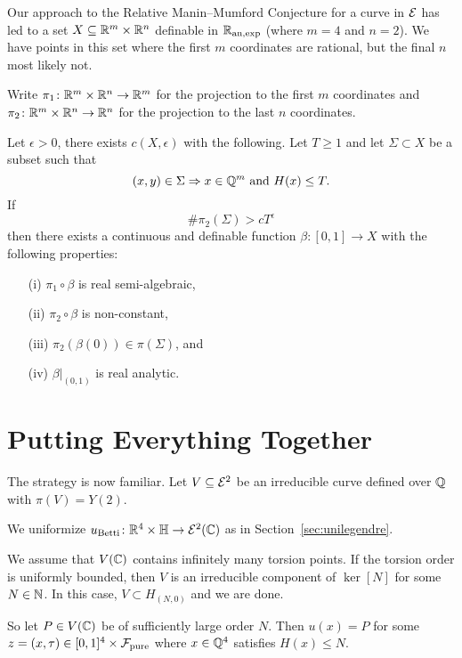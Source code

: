 Our approach to the Relative Manin--Mumford Conjecture for a curve in
${\mathcal E}$ has led to a set $X\subseteq {\mathbb{R}}^m\times{\mathbb{R}}^n$
definable in ${{\mathbb{R}}_{\mathrm{an,exp}}}$
(where $m=4$ and $n=2$). We have points in this set where the
first $m$ coordinates are rational, but the final $n$ most likely not.

Write $\pi_1\colon{\mathbb{R}}^m\times{\mathbb{R}}^n\rightarrow{\mathbb{R}}^m$ for the projection
to the first $m$ coordinates and
$\pi_2\colon{\mathbb{R}}^m\times{\mathbb{R}}^n\rightarrow{\mathbb{R}}^n$ for the projection to
the last $n$ coordinates. 

\begin{theorem}
  \label{thm:semirationalpw}
  Let $\epsilon>0$, there exists $c(X,\epsilon)$ with the following.
  Let $T\ge 1$ and let $\Sigma\subset X$ be a subset such that
  $$(x,y)\in
  \Sigma\Rightarrow x\in {\mathbb{Q}}^m \text{ and }H(x)\le T.$$
  If
  $$\#\pi_2(\Sigma)>cT^\epsilon$$
  then there exists a continuous and definable function $\beta\colon
  [0,1]\rightarrow X$ with the following properties:
  \begin{enumerate}
  \item [(i)] $\pi_1\circ\beta$ is real semi-algebraic,
  \item[(ii)] $\pi_2\circ\beta$ is non-constant,
  \item[(iii)] $\pi_2(\beta(0))\in \pi(\Sigma)$, and
  \item[(iv)] $\beta|_{(0,1)}$ is real analytic. 
  \end{enumerate}
\end{theorem}

\section{Putting Everything Together}

The strategy is now familiar.
Let $V\subseteq{\mathcal E}^2$ be an irreducible curve defined over ${\mathbb{Q}}$ with
$\pi(V)=Y(2)$.

We uniformize $u_{\mathrm{Betti}}\colon {\mathbb{R}}^4\times{\mathbb{H}} \rightarrow
{\mathcal E}^{2}({\mathbb{C}})$ as in Section~\ref{sec:unilegendre}.


We assume that $V({\mathbb{C}})$ contains infinitely many torsion points.
If the torsion order is uniformly bounded, then $V$ is an irreducible
component of $\ker[N]$ for some $N\in{\mathbb{N}}$.
In this case, $V\subset H_{(N,0)}$ and we are done. 

So let $P\in V({\mathbb{C}})$ be of sufficiently large order $N$. Then $u(x) = P$
for some $z=(x,\tau)\in [0,1]^4\times{\mathcal F}_{\mathrm{pure}}$
where $x\in{\mathbb{Q}}^4$ satisfies $H(x)\le N$.

